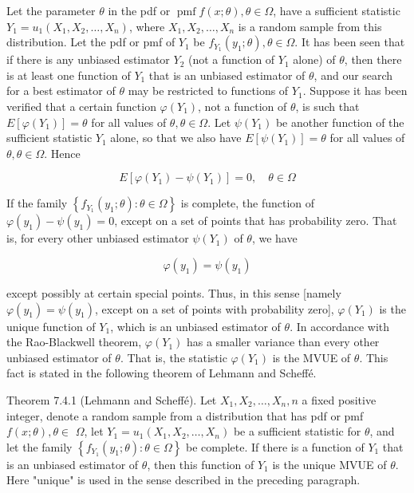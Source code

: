 Let the parameter $\theta$ in the pdf or $\operatorname{pmf} f(x ; \theta), \theta \in \Omega$, have a sufficient statistic $Y_{1}=u_{1}\left(X_{1}, X_{2}, \ldots, X_{n}\right)$, where $X_{1}, X_{2}, \ldots, X_{n}$ is a random sample from this distribution. Let the pdf or pmf of $Y_{1}$ be $f_{Y_{1}}\left(y_{1} ; \theta\right), \theta \in \Omega$. It has been seen that if there is any unbiased estimator $Y_{2}$ (not a function of $Y_{1}$ alone) of $\theta$, then there is at least one function of $Y_{1}$ that is an unbiased estimator of $\theta$, and our search for a best estimator of $\theta$ may be restricted to functions of $Y_{1}$. Suppose it has been verified that a certain function $\varphi\left(Y_{1}\right)$, not a function of $\theta$, is such that $E\left[\varphi\left(Y_{1}\right)\right]=\theta$ for all values of $\theta, \theta \in \Omega$. Let $\psi\left(Y_{1}\right)$ be another function of the sufficient statistic $Y_{1}$ alone, so that we also have $E\left[\psi\left(Y_{1}\right)\right]=\theta$ for all values of $\theta, \theta \in \Omega$. Hence

$$
E\left[\varphi\left(Y_{1}\right)-\psi\left(Y_{1}\right)\right]=0, \quad \theta \in \Omega
$$

If the family $\left\{f_{Y_{1}}\left(y_{1} ; \theta\right): \theta \in \Omega\right\}$ is complete, the function of $\varphi\left(y_{1}\right)-\psi\left(y_{1}\right)=0$, except on a set of points that has probability zero. That is, for every other unbiased estimator $\psi\left(Y_{1}\right)$ of $\theta$, we have

$$
\varphi\left(y_{1}\right)=\psi\left(y_{1}\right)
$$

except possibly at certain special points. Thus, in this sense [namely $\varphi\left(y_{1}\right)=\psi\left(y_{1}\right)$, except on a set of points with probability zero], $\varphi\left(Y_{1}\right)$ is the unique function of $Y_{1}$, which is an unbiased estimator of $\theta$. In accordance with the Rao-Blackwell theorem, $\varphi\left(Y_{1}\right)$ has a smaller variance than every other unbiased estimator of $\theta$. That is, the statistic $\varphi\left(Y_{1}\right)$ is the MVUE of $\theta$. This fact is stated in the following theorem of Lehmann and Scheffé.

Theorem 7.4.1 (Lehmann and Scheffé). Let $X_{1}, X_{2}, \ldots, X_{n}, n$ a fixed positive integer, denote a random sample from a distribution that has pdf or pmf $f(x ; \theta), \theta \in$ $\Omega$, let $Y_{1}=u_{1}\left(X_{1}, X_{2}, \ldots, X_{n}\right)$ be a sufficient statistic for $\theta$, and let the family $\left\{f_{Y_{1}}\left(y_{1} ; \theta\right): \theta \in \Omega\right\}$ be complete. If there is a function of $Y_{1}$ that is an unbiased estimator of $\theta$, then this function of $Y_{1}$ is the unique MVUE of $\theta$. Here "unique" is used in the sense described in the preceding paragraph.

